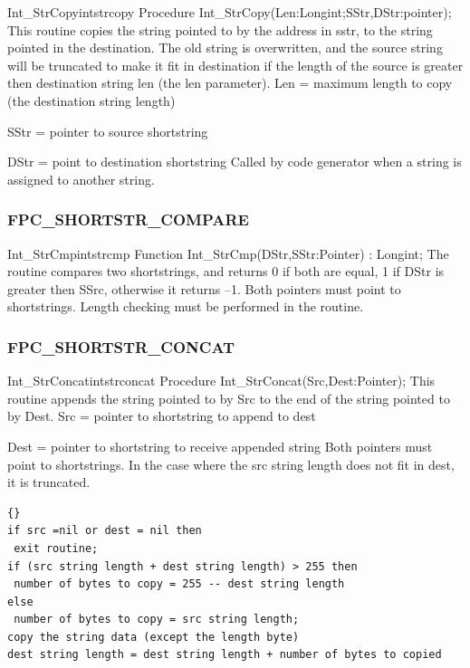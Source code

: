 \documentclass [a4paper,12pt]{article}
\begin{document}
\begin{procedurel}{Int{\_}StrCopy}{intstrcopy}
\Declaration
Procedure Int{\_}StrCopy(Len:Longint;SStr,DStr:pointer);
\Description
This routine copies the string pointed to by the address in sstr, to the
string pointed in the destination. The old string is overwritten, and the
source string will be truncated to make it fit in destination if the length
of the source is greater then destination string len (the len parameter).
\Parameters
Len = maximum length to copy (the destination string length) \par
SStr = pointer to source shortstring \par
DStr = point to destination shortstring
\Notes
Called by code generator when a string is assigned to another string.
\end{procedurel}

\subsubsection{FPC{\_}SHORTSTR{\_}COMPARE}
\label{subsubsec:mylabel37}

\begin{functionl}{Int{\_}StrCmp}{intstrcmp}
\Declaration
Function Int{\_}StrCmp(DStr,SStr:Pointer) : Longint;
\Description
The routine compares two shortstrings, and returns 0 if both are equal, 1 if
\textsf{DStr} is greater then \textsf{SSrc}, otherwise it returns --1.
\Notes
Both pointers must point to shortstrings. Length checking must be performed
in the routine.
\end{functionl}

\subsubsection{FPC{\_}SHORTSTR{\_}CONCAT}
\label{subsubsec:mylabel38}

\begin{procedurel}{Int{\_}StrConcat}{intstrconcat}
\Declaration
Procedure Int{\_}StrConcat(Src,Dest:Pointer);
\Description
This routine appends the string pointed to by \textsf{Src} to the end of the
string pointed to by \textsf{Dest}.
\Parameters
Src  = pointer to shortstring to append to dest \par
Dest = pointer to shortstring to receive appended string
\Notes
Both pointers must point to shortstrings. In the case where the src string
length does not fit in dest, it is truncated.
\Algorithm
\begin{lstlisting}{}
if src =nil or dest = nil then 
 exit routine;
if (src string length + dest string length) > 255 then
 number of bytes to copy = 255 -- dest string length
else
 number of bytes to copy = src string length;
copy the string data (except the length byte)
dest string length = dest string length + number of bytes to copied
\end{lstlisting}
\end{procedurel}
\end{document}
